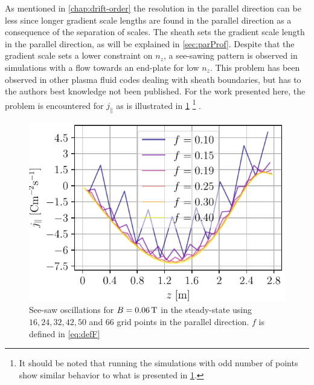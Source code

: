 As mentioned in \cref{chap:drift-order} the resolution in the parallel direction can be less since longer gradient scale lengths are found in the parallel direction as a consequence of the separation of scales.
The sheath sets the gradient scale length in the parallel direction, as will be explained in \cref{sec:parProf}.
Despite that the gradient scale sets a lower constraint on $n_z$, a see-sawing pattern is observed in simulations with a flow towards an end-plate for low $n_z$.
This problem has been observed in other plasma fluid codes dealing with sheath boundaries, but has to the authors best knowledge not been published.
For the work presented here, the problem is encountered for $j_\|$ as is illustrated in \cref{fig:see-saw}%
\footnote{It should be noted that running the simulations with odd number of points show similar behavior to what is presented in \cref{fig:see-saw}.}%
%
.
%
\begin{figure}[htb]
    \centering
    \includegraphics{fig/results/jParRipple006}
    \caption{See-saw oscillations for $B=0.06\, \text{T}$ in the steady-state using $16, 24, 32, 42, 50$ and $66$ grid points in the parallel direction.
        $f$ is defined in \cref{eq:defF}
    }
    \label{fig:see-saw}
\end{figure}
%


